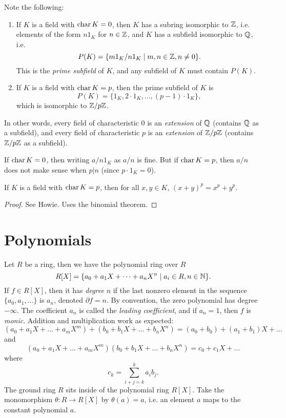 \begin{remark}
  Note the following:
  \begin{enumerate}
    \item If $K$ is a field with $\operatorname{char} K = 0$, then
      $K$ has a subring isomorphic to $\mathbb{Z}$, i.e.
      elements of the form $n 1_K$ for $n \in \mathbb{Z}$,
      and $K$ has a subfield isomorphic to $\mathbb{Q}$,
      i.e.
      \[P(K) = \{m 1_K / n 1_K \mid m, n \in \mathbb{Z}, n \ne 0\}.\]
      This is the \emph{prime subfield} of $K$,
      and any subfield of $K$ must contain $P(K)$.
    \item If $K$ is a field with $\operatorname{char} K = p$, then
      the prime subfield of $K$ is
      \[P(K) = \{1_K, 2 \cdot 1_K, \dots, (p - 1) \cdot 1_K\},\]
      which is isomorphic to $\mathbb{Z} / p \mathbb{Z}$.
  \end{enumerate}
\end{remark}

\begin{remark}
  In other words, every field of characteristic $0$
  is an \emph{extension} of $\mathbb{Q}$ (contains $\mathbb{Q}$ as a subfield),
  and every field of characteristic $p$ is an
  \emph{extension} of $\mathbb{Z} / p \mathbb{Z}$ (contains $\mathbb{Z} / p\mathbb{Z}$
  as a subfield).
\end{remark}

\begin{remark}
  If $\operatorname{char} K = 0$, then writing $a / n 1_K$ as
  $a / n$ is fine. But if $\operatorname{char} K = p$, then
  $a / n$ does not make sense when $p | n$
  (since $p \cdot 1_K = 0$).
\end{remark}

\begin{theorem}
  If $K$ is a field with $\operatorname{char} K = p$, then
  for all $x, y \in K$, $(x + y)^p = x^p + y^p$.
\end{theorem}

\begin{proof}
  See Howie. Uses the binomial theorem.
\end{proof}

\section{Polynomials}
Let $R$ be a ring, then we have the polynomial ring
over $R$
\[
  R[X] = \{a_0 + a_1 X + \dots + a_n X^n \mid a_i \in R, n \in \mathbb{N}\}.
\]
If $f \in R[X]$, then it has \emph{degree} $n$ if the
last nonzero element in the sequence
$\{a_0, a_1, \dots\}$ is $a_n$, denoted
$\partial f = n$. By convention, the zero polynomial has
degree $-\infty$. The coefficient $a_n$ is called the
\emph{leading coefficient}, and if $a_n = 1$, then
$f$ is \emph{monic}. Addition and multiplication work
as expected:
\[
  (a_0 + a_1 X + \dots + a_m X^m) + (b_0 + b_1 X + \dots + b_n X^n)
  = (a_0 + b_0) + (a_1 + b_1) X + \dots
\]
and
\[
  (a_0 + a_1 X + \dots + a_m X^m)(b_0 + b_1 X + \dots + b_n X^n)
  = c_0 + c_1 X + \dots
\]
where
\[
  c_k = \sum_{i + j = k}^k a_i b_{j}.
\]
The ground ring $R$ sits inside of the polynomial ring
$R[X]$. Take the monomorphism $\theta : R \to R[X]$
by $\theta(a) = a$, i.e. an element $a$ maps to the
constant polynomial $a$.


